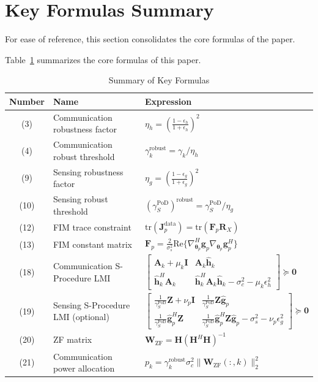 \documentclass[12pt,a4paper]{article}
\newcommand{\vect}[1]{\mathbf{#1}}
\newcommand{\mat}[1]{\mathbf{#1}}
\newcommand{\norm}[1]{\|#1\|_2}
\newcommand{\tr}{\text{tr}}
\newcommand{\Real}{\text{Re}}
\begin{document}
\section{Key Formulas Summary}

For ease of reference, this section consolidates the core formulas of the paper.

Table~\ref{tab:formulas} summarizes the core formulas of this paper.

\begin{table}[htbp]
\centering
\caption{Summary of Key Formulas}\label{tab:formulas}
\begin{tabular}{cll}
\toprule
Number & Name & Expression \\
\midrule
(3) & Communication robustness factor & $\eta_h = \left(\frac{1-\epsilon_h}{1+\epsilon_h}\right)^2$ \\
(4) & Communication robust threshold & $\gamma_k^{\text{robust}} = \gamma_k / \eta_h$ \\
(9) & Sensing robustness factor & $\eta_g = \left(\frac{1-\epsilon_g}{1+\epsilon_g}\right)^2$ \\
(10) & Sensing robust threshold & $(\gamma_S^{\text{PoD}})^{\text{robust}} = \gamma_S^{\text{PoD}} / \eta_g$ \\
(12) & FIM trace constraint & $\tr(\mat{J}_p^{\text{data}}) = \tr(\mat{F}_p \mat{R}_X)$ \\
(13) & FIM constant matrix & $\mat{F}_p = \frac{2}{\sigma_s^2} \Real\Big\{ \nabla_{\boldsymbol{\theta}_p}^H \vect{g}_p \nabla_{\boldsymbol{\theta}_p} \vect{g}_p^H \Big\}$ \\
(18) & Communication S-Procedure LMI & $\begin{bmatrix} \mat{A}_k + \mu_k \mat{I} & \mat{A}_k \hat{\vect{h}}_k \\[1.5ex] \hat{\vect{h}}_k^H \mat{A}_k & \hat{\vect{h}}_k^H \mat{A}_k \hat{\vect{h}}_k - \sigma_c^2 - \mu_k \epsilon_h^2 \end{bmatrix} \succeq \mat{0}$ \\
(19) & Sensing S-Procedure LMI (optional) & $\begin{bmatrix} \frac{1}{\gamma_S^{\text{PoD}}} \mat{Z} + \nu_p \mat{I} & \frac{1}{\gamma_S^{\text{PoD}}} \mat{Z} \hat{\vect{g}}_p \\[1.5ex] \frac{1}{\gamma_S^{\text{PoD}}} \hat{\vect{g}}_p^H \mat{Z} & \frac{1}{\gamma_S^{\text{PoD}}} \hat{\vect{g}}_p^H \mat{Z} \hat{\vect{g}}_p - \sigma_s^2 - \nu_p \epsilon_g^2 \end{bmatrix} \succeq \mat{0}$ \\
(20) & ZF matrix & $\mat{W}_{\text{ZF}} = \mat{H} (\mat{H}^H \mat{H})^{-1}$ \\
(21) & Communication power allocation & $p_k = \gamma_k^{\text{robust}} \sigma_c^2 \norm{\mat{W}_{\text{ZF}}(:,k)}^2$ \\
\bottomrule
\end{tabular}
\end{table}
\end{document}
